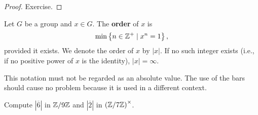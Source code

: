 \documentclass[11pt,a4paper]{article}
\begin{document}
\begin{proof}
    Exercise.
\end{proof}


\begin{defi}
    Let  $G$ be a group and $x \in G$.
    The \textbf{order} of $x$ is
    \[\min\left\{ n\in \mathbb{Z}^+ \mid x^n = 1 \right\},\]
    provided it exists. 
    We denote the order of \(x\) by $|x|$. 
    If no such integer exists (i.e., if no positive power of \(x\) is the identity),   \(|x|=\infty\).
    
\end{defi}


\begin{rem}
    This notation must not be regarded as an absolute value.
    The use of the bars  should cause no problem because it is used in a different context.
\end{rem}


\begin{eje}
    Compute \(|\overline{6}|\) in \( \mathbb{Z}/9\mathbb{Z} \) and \(|\overline{2}|\) in \(\left( \mathbb{Z}/7\mathbb{Z} \right)^\times\).
\end{eje}
\end{document}
